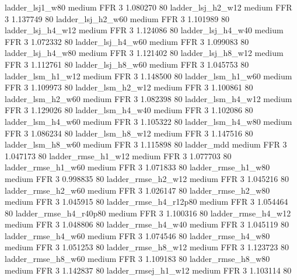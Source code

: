        ladder_lsj1_w80     medium      FFR                 3 1.080270 80
     ladder_lsj_h2_w12     medium      FFR                 3 1.137749 80
     ladder_lsj_h2_w60     medium      FFR                 3 1.101989 80
     ladder_lsj_h4_w12     medium      FFR                 3 1.124086 80
     ladder_lsj_h4_w40     medium      FFR                 3 1.072332 80
     ladder_lsj_h4_w60     medium      FFR                 3 1.099083 80
     ladder_lsj_h4_w80     medium      FFR                 3 1.121402 80
     ladder_lsj_h8_w12     medium      FFR                 3 1.112761 80
     ladder_lsj_h8_w60     medium      FFR                 3 1.045753 80
     ladder_lsm_h1_w12     medium      FFR                 3 1.148500 80
     ladder_lsm_h1_w60     medium      FFR                 3 1.109973 80
     ladder_lsm_h2_w12     medium      FFR                 3 1.100861 80
     ladder_lsm_h2_w60     medium      FFR                 3 1.082398 80
     ladder_lsm_h4_w12     medium      FFR                 3 1.129026 80
     ladder_lsm_h4_w40     medium      FFR                 3 1.102086 80
     ladder_lsm_h4_w60     medium      FFR                 3 1.105322 80
     ladder_lsm_h4_w80     medium      FFR                 3 1.086234 80
     ladder_lsm_h8_w12     medium      FFR                 3 1.147516 80
     ladder_lsm_h8_w60     medium      FFR                 3 1.115898 80
            ladder_mdd     medium      FFR                 3 1.047173 80
    ladder_rmse_h1_w12     medium      FFR                 3 1.077703 80
    ladder_rmse_h1_w60     medium      FFR                 3 1.071833 80
    ladder_rmse_h1_w80     medium      FFR                 3 0.998835 80
    ladder_rmse_h2_w12     medium      FFR                 3 1.045216 80
    ladder_rmse_h2_w60     medium      FFR                 3 1.026147 80
    ladder_rmse_h2_w80     medium      FFR                 3 1.045915 80
 ladder_rmse_h4_r12p80     medium      FFR                 3 1.054464 80
 ladder_rmse_h4_r40p80     medium      FFR                 3 1.100316 80
    ladder_rmse_h4_w12     medium      FFR                 3 1.048806 80
    ladder_rmse_h4_w40     medium      FFR                 3 1.045119 80
    ladder_rmse_h4_w60     medium      FFR                 3 1.074546 80
    ladder_rmse_h4_w80     medium      FFR                 3 1.051253 80
    ladder_rmse_h8_w12     medium      FFR                 3 1.123723 80
    ladder_rmse_h8_w60     medium      FFR                 3 1.109183 80
    ladder_rmse_h8_w80     medium      FFR                 3 1.142837 80
   ladder_rmsej_h1_w12     medium      FFR                 3 1.103114 80
